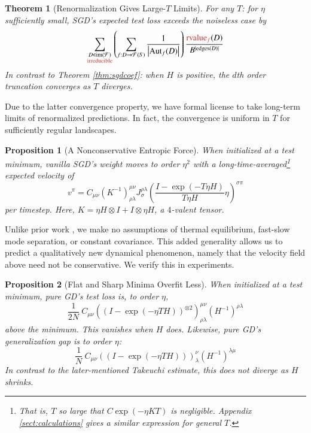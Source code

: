 \documentclass{article}
\newtheorem{thm}{Theorem}
\newtheorem{prop}{Proposition}
\newcommand{\Free}{\mathcal{F}}
\newcommand{\Aut}{\text{\textnormal{Aut}}}
\newcommand{\image}{\text{\textnormal{im}}}
\newcommand{\rvalue}{\text{\textnormal{rvalue}}}
\newcommand{\edges}{\text{\textnormal{edges}}}
\newcommand{\wrap}[1]{\left(#1\right)}
\newcommand{\wabs}[1]{\left|#1\right|}
\begin{document}
        \begin{thm}[Renormalization Gives Large-$T$ Limits] \label{thm:renorm}
            For any $T$: for $\eta$ sufficiently small, SGD's expected test
            loss exceeds the noiseless case by 
            \begin{equation} \label{eq:renorm}
                \sum_{\substack{D \in \image(\Free)\\ \text{\color{moor} irreducible}}}
                \wrap{
                    \sum_{f: D\to\Free(S)}
                    \frac{1}{\wabs{\Aut_f(D)}}
                }
                \frac{{\color{moor} \rvalue_f}(D)}{B^{|\edges(D)|}}
            \end{equation}
            In contrast to Theorem \ref{thm:sgdcoef}: when $H$ is positive, the
            $d$th order truncation converges as $T$ diverges.
        \end{thm}
        Due to the latter convergence property, we have formal license to 
        take long-term limits of renormalized predictions.  In fact, the
        convergence is uniform in $T$ for sufficiently regular landscapes.
        \begin{prop}[A Nonconservative Entropic Force]\label{prop:entropic}
            When initialized at a test minimum, vanilla SGD's weight moves to
            order $\eta^2$ with a long-time-averaged\footnote{
                That is, $T$ so large that $C \exp(-\eta K T)$ is negligible.
                Appendix \ref{sect:calculations} gives a similar expression for general $T$.
            }
            expected velocity of
            $$
                v^\pi = C_{\mu \nu}
                \wrap{K^{-1}}^{\mu\nu}_{\rho\lambda}
                J^{\rho\lambda}_{\sigma}
                \wrap{\frac{I - \exp(-T \eta H)}{T \eta H} \eta}^{\sigma \pi}
            $$
            per timestep.
            Here, $K = \eta H \otimes I + I \otimes \eta H$, a
            $4$-valent tensor. 
        \end{prop}
        Unlike prior work \cite{we19b}, we make no assumptions of
        thermal equilibrium, fast-slow mode separation, or constant covariance.
        This added generality allows us to predict a qualitatively new
        dynamical phenomenon, namely that the velocity field above need not be
        conservative.  We verify this in experiments.
        \begin{prop}[Flat and Sharp Minima Overfit Less]\label{prop:overfit}
            When initialized at a test minimum, pure GD's test loss is, to
            order $\eta$, 
            $$
                \frac{1}{2N} ~
                    C_{\mu\nu}
                    \wrap{(I - \exp(-\eta T H))^{\otimes 2}}^{\mu\nu}_{\rho\lambda}
                    \wrap{H^{-1}}^{\rho\lambda}
            $$
            above the minimum.  This vanishes when $H$ does. 
            Likewise, pure GD's generalization gap is to order $\eta$:  
            $$
                \frac{1}{N} ~
                    C_{\mu\nu}
                    \wrap{(I - \exp(-\eta T H))}^{\nu}_{\lambda}
                    \wrap{H^{-1}}^{\lambda\mu}
            $$
            In contrast to the later-mentioned Takeuchi estimate, this does not
            diverge as $H$ shrinks.
        \end{prop}
\end{document}

